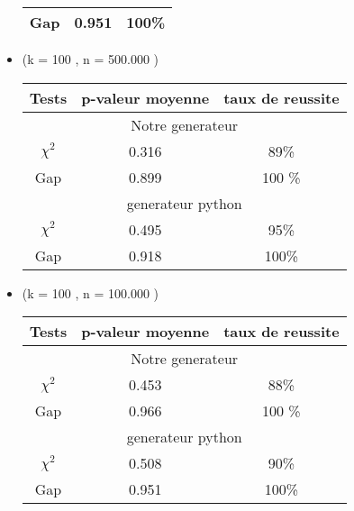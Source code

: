 \begin{itemize}
\begin{center}
\begin{tabular}{c|c|c}
                Gap & 0.951 & 100\%\\
                \hline
            \end{tabular}
            
       \end{center}
    
    \item (k = 100 , n = 500.000 ) 
       \begin{center}

            \begin{tabular}{c|c|c}
                \hline
                Tests & p-valeur moyenne & taux de reussite \\
                \hline
                    \multicolumn{3}{c}{Notre generateur} \\
                \hline
                $\chi^2$ & 0.316  & 89\% \\
                
                Gap & 0.899 &  100 \%\\
                \hline
                 \multicolumn{3}{c}{generateur python} \\
                \hline
                $\chi^2$ & 0.495 & 95\% \\
                
                Gap & 0.918 & 100\%\\
                \hline
            \end{tabular}
       \end{center}
    


   \item  (k = 100 , n = 100.000 ) 
       \begin{center}
            \begin{tabular}{c|c|c}
                \hline
                Tests & p-valeur moyenne & taux de reussite \\
                \hline
                    \multicolumn{3}{c}{Notre generateur} \\
                \hline
                $\chi^2$ & 0.453  & 88\% \\
                
                Gap & 0.966 &  100 \%\\
                \hline
                 \multicolumn{3}{c}{generateur python} \\
                \hline
                $\chi^2$ & 0.508 & 90\% \\
                
                Gap & 0.951 & 100\%\\
                \hline
            \end{tabular}
       
        \end{center}
\end{itemize}



